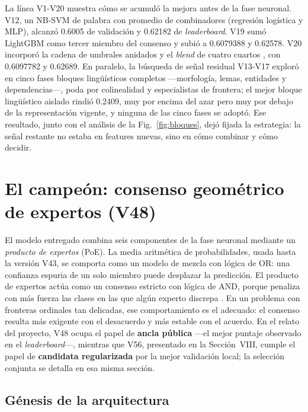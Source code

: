 \documentclass[journal]{IEEEtai}
\begin{document}
La l\'inea V1-V20 muestra c\'omo se acumul\'o la mejora antes de la fase neuronal. V12, un NB-SVM de palabra con promedio de combinadores (regresi\'on log\'istica y MLP), alcanz\'o 0.6005 de validaci\'on y 0.62182 de \textit{leaderboard}. V19 sum\'o LightGBM \cite{ke2017} como tercer miembro del consenso y subi\'o a 0.6079388 y 0.62578. V20 incorpor\'o la cadena de umbrales anidados y el \textit{blend} de cuatro cuartos \cite{frank2001}, con 0.6097782 y 0.62689. En paralelo, la b\'usqueda de se\~nal residual V13-V17 explor\'o en cinco fases bloques ling\"u\'isticos completos ---morfolog\'ia, lemas, entidades y dependencias---, poda por colinealidad y especialistas de frontera; el mejor bloque ling\"u\'istico aislado rindi\'o 0.2409, muy por encima del azar pero muy por debajo de la representaci\'on vigente, y ninguna de las cinco fases se adopt\'o. Ese resultado, junto con el an\'alisis de la Fig.~\ref{fig:bloques}, dej\'o fijada la estrategia: la se\~nal restante no estaba en features nuevas, sino en c\'omo combinar y c\'omo decidir.

\section{El campe\'on: consenso geom\'etrico de expertos (V48)}

El modelo entregado combina seis componentes de la fase neuronal mediante un \emph{producto de expertos} (PoE). La media aritm\'etica de probabilidades, usada hasta la versi\'on V43, se comporta como un modelo de mezcla con l\'ogica de OR: una confianza espuria de un solo miembro puede desplazar la predicci\'on. El producto de expertos act\'ua como un consenso estricto con l\'ogica de AND, porque penaliza con m\'as fuerza las clases en las que alg\'un experto discrepa \cite{hinton2002,heskes1998}. En un problema con fronteras ordinales tan delicadas, ese comportamiento es el adecuado: el consenso resulta m\'as exigente con el desacuerdo y m\'as estable con el acuerdo. En el relato del proyecto, V48 ocupa el papel de \textbf{ancla p\'ublica} ---el mejor puntaje observado en el \textit{leaderboard}---, mientras que V56, presentado en la Secci\'on~VIII, cumple el papel de \textbf{candidata regularizada} por la mejor validaci\'on local; la selecci\'on conjunta se detalla en esa misma secci\'on.

\subsection{G\'enesis de la arquitectura}
\end{document}
